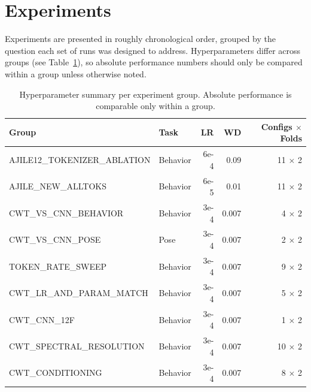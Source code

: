 \documentclass[11pt, a4paper]{article}
\begin{document}
\section{Experiments}
\label{sec:experiments}

Experiments are presented in roughly chronological order, grouped by the
question each set of runs was designed to address. Hyperparameters differ
across groups (see Table~\ref{tab:hp-summary}), so absolute performance
numbers should only be compared within a group unless otherwise noted.

\begin{table}[H]
      \centering
      \footnotesize
      \begin{tabular}{llrrr}
            \toprule
            \textbf{Group}               & \textbf{Task} & \textbf{LR} & \textbf{WD} & \textbf{Configs $\times$ Folds} \\
            \midrule
            AJILE12\_TOKENIZER\_ABLATION & Behavior      & 6e-4        & 0.09        & 11 $\times$ 2                   \\
            AJILE\_NEW\_ALLTOKS          & Behavior      & 6e-5        & 0.01        & 11 $\times$ 2                   \\
            CWT\_VS\_CNN\_BEHAVIOR       & Behavior      & 3e-4        & 0.007       & 4 $\times$ 2                    \\
            CWT\_VS\_CNN\_POSE           & Pose          & 3e-4        & 0.007       & 2 $\times$ 2                    \\
            TOKEN\_RATE\_SWEEP           & Behavior      & 3e-4        & 0.007       & 9 $\times$ 2                    \\
            CWT\_LR\_AND\_PARAM\_MATCH   & Behavior      & 3e-4        & 0.007       & 5 $\times$ 2                    \\
            CWT\_CNN\_12F               & Behavior      & 3e-4        & 0.007       & 1 $\times$ 2                    \\
            CWT\_SPECTRAL\_RESOLUTION  & Behavior      & 3e-4        & 0.007       & 10 $\times$ 2                   \\
            CWT\_CONDITIONING          & Behavior      & 3e-4        & 0.007       & 8 $\times$ 2                    \\
            \bottomrule
      \end{tabular}
      \caption{Hyperparameter summary per experiment group. Absolute
            performance is comparable only within a group.}
      \label{tab:hp-summary}
\end{table}
\end{document}
